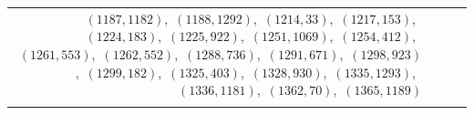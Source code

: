 \documentclass[11pt]{article}
\begin{document}
\begin{longtable}{@{}rrl>{\raggedright\arraybackslash}p{}@{}}
$(1187,1182)$,\allowbreak\ $(1188,1292)$,\allowbreak\ $(1214,33)$,\allowbreak\ $(1217,153)$,\allowbreak\ $(1224,183)$,\allowbreak\ $(1225,922)$,\allowbreak\ $(1251,1069)$,\allowbreak\ $(1254,412)$,\allowbreak\ $(1261,553)$,\allowbreak\ $(1262,552)$,\allowbreak\ $(1288,736)$,\allowbreak\ $(1291,671)$,\allowbreak\ $(1298,923)$,\allowbreak\ $(1299,182)$,\allowbreak\ $(1325,403)$,\allowbreak\ $(1328,930)$,\allowbreak\ $(1335,1293)$,\allowbreak\ $(1336,1181)$,\allowbreak\ $(1362,70)$,\allowbreak\ $(1365,1189)$\\
\addlinespace[3pt]
\end{longtable}
\endgroup
\end{document}
